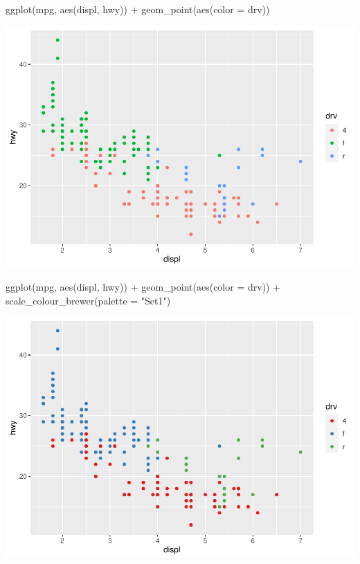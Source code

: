 \documentclass[
]{article}
\newenvironment{Shaded}{\begin{snugshade}}{\end{snugshade}}
\newcommand{\AttributeTok}[1]{\textcolor[rgb]{0.77,0.63,0.00}{#1}}
\newcommand{\FunctionTok}[1]{\textcolor[rgb]{0.00,0.00,0.00}{#1}}
\newcommand{\NormalTok}[1]{#1}
\newcommand{\SpecialCharTok}[1]{\textcolor[rgb]{0.00,0.00,0.00}{#1}}
\newcommand{\StringTok}[1]{\textcolor[rgb]{0.31,0.60,0.02}{#1}}
\begin{document}
\begin{Shaded}
\begin{Highlighting}[]
\FunctionTok{ggplot}\NormalTok{(mpg, }\FunctionTok{aes}\NormalTok{(displ, hwy)) }\SpecialCharTok{+}
  \FunctionTok{geom\_point}\NormalTok{(}\FunctionTok{aes}\NormalTok{(}\AttributeTok{color =}\NormalTok{ drv))}
\end{Highlighting}
\end{Shaded}

\includegraphics{Journal_files/figure-latex/unnamed-chunk-65-1.pdf}

\begin{Shaded}
\begin{Highlighting}[]
\FunctionTok{ggplot}\NormalTok{(mpg, }\FunctionTok{aes}\NormalTok{(displ, hwy)) }\SpecialCharTok{+}
  \FunctionTok{geom\_point}\NormalTok{(}\FunctionTok{aes}\NormalTok{(}\AttributeTok{color =}\NormalTok{ drv)) }\SpecialCharTok{+}
  \FunctionTok{scale\_colour\_brewer}\NormalTok{(}\AttributeTok{palette =} \StringTok{"Set1"}\NormalTok{)}
\end{Highlighting}
\end{Shaded}

\includegraphics{Journal_files/figure-latex/unnamed-chunk-65-2.pdf}
\end{document}
